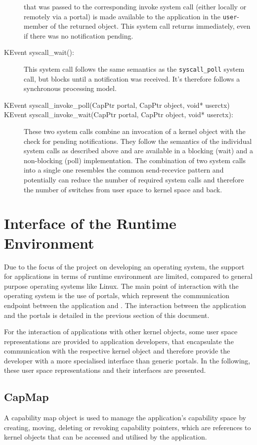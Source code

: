 \begin{description}
that was passed to the corresponding invoke system call (either locally or
remotely via a portal) is made available to the application in the
\texttt{user}-member of the returned object. This system call returns
immediately, even if there was no notification pending.
\item[KEvent syscall\_wait():] This system call follows the same semantics as
the \texttt{syscall\_poll} system call, but blocks until a notification was
received. It's therefore follows a synchronous processing model.
\item[KEvent syscall\_invoke\_poll(CapPtr portal, CapPtr object, void* userctx)]
\item[KEvent syscall\_invoke\_wait(CapPtr portal, CapPtr object, void*
userctx):] These two system calls combine an invocation of a kernel object with
the check for pending notifications. They follow the semantics of the individual
system calls as described above and are available in a blocking (wait) and a
non-blocking (poll) implementation. The combination of two system calls into a
single one resembles the common send-recevice pattern and potentially can reduce
the number of required system calls and therefore the number of switches from
user space to kernel space and back.
\end{description}

\section{Interface of the \mythos Runtime Environment} Due to the focus of the
\mythos project on developing an operating system, the support for applications
in terms of runtime environment are limited, compared to general purpose
operating systems like Linux. The main point of interaction with the operating
system is the use of portals, which represent the communication endpoint between
the application and \mythos. The interaction between the application and the
portals is detailed in the previous section of this document.

For the interaction of applications with other kernel objects, some user space
representations are provided to application developers, that encapsulate the
communication with the respective kernel object and therefore provide the
developer with a more specialised interface than generic portals. In the
following, these user space representations and their interfaces are presented.

\subsection{CapMap}
A capability map object is used to manage the application's capability space by creating, moving, deleting or revoking capability pointers, which are references to kernel objects that can be accessed and utilised by the application.

